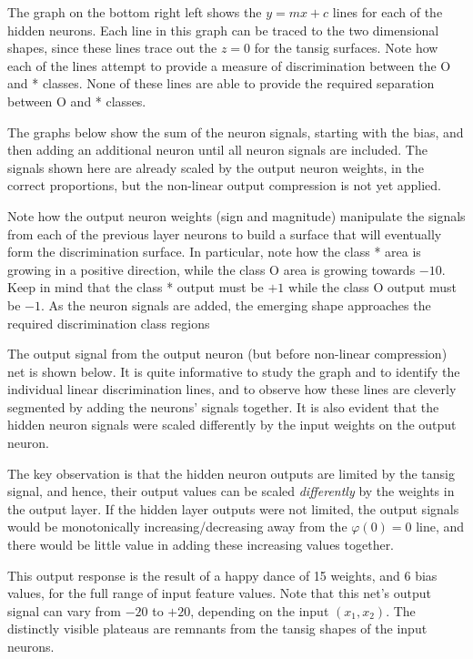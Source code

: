 The graph on the bottom right left shows the $y=mx+c$ lines for each of the hidden neurons.  Each line in this graph can be traced to the two dimensional shapes, since these lines trace out the $z=0$  for the tansig surfaces.  Note how each of the lines attempt to provide a measure of discrimination between the O and * classes.  None of these lines are able to provide the required separation between O and * classes.   

 
 
The graphs below show the sum of the neuron signals, starting with the bias, and then adding an additional neuron until all neuron signals are included.  The signals shown here are already scaled by the output neuron weights, in the correct proportions, but the non-linear output compression is not yet applied. 

Note how the output neuron weights (sign and magnitude) manipulate the signals from each of the previous layer neurons to build a surface that will eventually form the discrimination surface.  In particular, note how the class * area is growing in a positive direction, while the class O area is growing towards $-10$.  Keep in mind that the class * output must be $+1$ while the class O output must be $-1$.  As the neuron signals are added, the emerging shape approaches the required discrimination class regions 
 
 
The output signal from the output neuron (but before non-linear compression) net is shown below.   It is quite informative to study the graph and to identify the individual linear discrimination lines, and to observe how these lines are cleverly segmented by adding the neurons' signals together.   It is also evident that the hidden neuron signals  were scaled differently by the input weights on the output neuron.  

The key observation is that the hidden neuron outputs are limited by the tansig signal, and hence, their output values can be scaled \textit{differently} by the weights in the output layer.  If the hidden layer outputs were not limited, the output signals would be monotonically increasing/decreasing away from the $\varphi(0)=0$  line, and there would be little value in adding these increasing values together. 

This output response is the result of a happy dance of 15 weights, and 6 bias values, for the full range of input feature values.  Note that this net's output signal can vary from $-20$ to $+20$, depending on the input  $(x_1,x_2)$.    The distinctly visible plateaus are remnants from the tansig shapes of the input neurons.  

